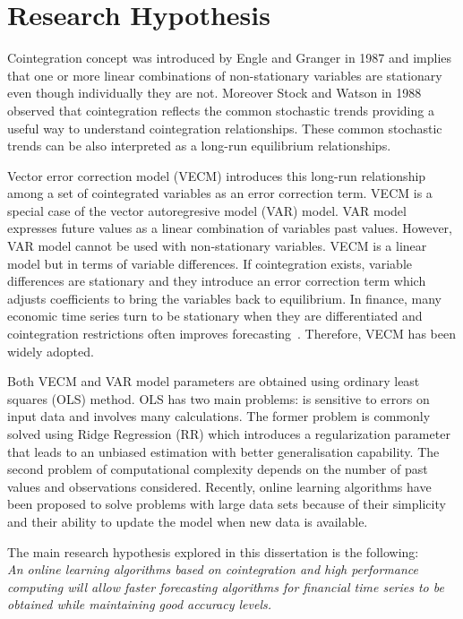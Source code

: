 \section{Research Hypothesis}


Cointegration concept was introduced by Engle and Granger in 1987 \cite{engle1987} and implies that one or
more linear combinations of non-stationary variables are stationary even though
individually they are not.  Moreover Stock and Watson in 1988 \cite{stock+watson1988} observed that
cointegration reflects the common stochastic trends providing a useful way to
understand cointegration relationships. These common stochastic trends can be
also interpreted as a long-run equilibrium relationships.

Vector error correction model (VECM) introduces this long-run relationship
among a set of cointegrated variables as an error correction term. VECM is a
special case of the vector autoregresive model (VAR) model. VAR model
expresses future values as a linear combination of variables past values.
However, VAR model cannot be used with non-stationary variables. VECM is a
linear model but in terms of variable differences. If cointegration exists,
variable differences are stationary and they introduce an error correction term
which adjusts coefficients to bring the variables back to equilibrium. In
finance, many economic time series turn to be stationary when they are
differentiated and cointegration restrictions often improves
forecasting~\cite{duy1998}. Therefore, VECM has been widely adopted.

Both VECM and VAR model parameters are obtained using ordinary least squares
(OLS) method. OLS has two main problems: is sensitive to errors on input data
and involves many calculations. The former problem is commonly solved using
Ridge Regression (RR) \cite{hoerl1970} which introduces a regularization
parameter that leads to an unbiased estimation with better generalisation
capability. The second problem of computational complexity depends on the number
of past values and observations considered.  Recently, online learning
algorithms have been proposed to solve problems with large data sets because of
their simplicity and their ability to update the model when new data is
available. 

The main research hypothesis explored in this dissertation is the following:
\\

\textit{An online learning algorithms based on cointegration and high
performance computing will allow faster forecasting
algorithms for financial time series to be obtained while maintaining good accuracy levels.}



